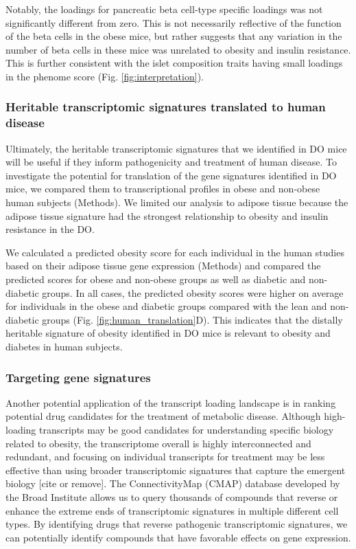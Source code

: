 \documentclass[
]{article}
\begin{document}
Notably, the loadings for pancreatic beta cell-type specific loadings
was not significantly different from zero. This is not necessarily
reflective of the function of the beta cells in the obese mice, but
rather suggests that any variation in the number of beta cells in these
mice was unrelated to obesity and insulin resistance. This is further
consistent with the islet composition traits having small loadings in
the phenome score (Fig. \ref{fig:interpretation}).

\subsubsection{Heritable transcriptomic signatures translated to human
disease}\label{heritable-transcriptomic-signatures-translated-to-human-disease}

Ultimately, the heritable transcriptomic signatures that we identified
in DO mice will be useful if they inform pathogenicity and treatment of
human disease. To investigate the potential for translation of the gene
signatures identified in DO mice, we compared them to transcriptional
profiles in obese and non-obese human subjects (Methods). We limited our
analysis to adipose tissue because the adipose tissue signature had the
strongest relationship to obesity and insulin resistance in the DO.

We calculated a predicted obesity score for each individual in the human
studies based on their adipose tissue gene expression (Methods) and
compared the predicted scores for obese and non-obese groups as well as
diabetic and non-diabetic groups. In all cases, the predicted obesity
scores were higher on average for individuals in the obese and diabetic
groups compared with the lean and non-diabetic groups (Fig.
\ref{fig:human_translation}D). This indicates that the distally
heritable signature of obesity identified in DO mice is relevant to
obesity and diabetes in human subjects.

\subsubsection{Targeting gene
signatures}\label{targeting-gene-signatures}

Another potential application of the transcript loading landscape is in
ranking potential drug candidates for the treatment of metabolic
disease. Although high-loading transcripts may be good candidates for
understanding specific biology related to obesity, the transcriptome
overall is highly interconnected and redundant, and focusing on
individual transcripts for treatment may be less effective than using
broader transcriptomic signatures that capture the emergent biology
{[}cite or remove{]}. The ConnectivityMap (CMAP) database
\cite{pmid17008526} developed by the Broad Institute allows us to query
thousands of compounds that reverse or enhance the extreme ends of
transcriptomic signatures in multiple different cell types. By
identifying drugs that reverse pathogenic transcriptomic signatures, we
can potentially identify compounds that have favorable effects on gene
expression.
\end{document}
